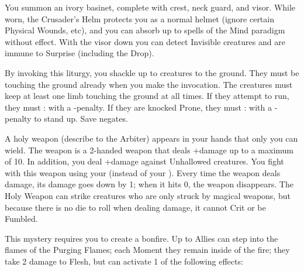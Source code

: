 {
\MYSTERY [
  Name = Crusader's Helm,
  Link = arcana-mystery-crusaders-helm,
  Paradigm = Force,
  Save = n/a,
  Duration = Session,
  Target = Self
]

You summon an ivory basinet, complete with crest, neck guard, and visor.  While worn, the Crusader's Helm protects you as a normal helmet (ignore certain Physical Wounds, etc), and you can absorb up to \DICE spells of the Mind paradigm without effect.  With the visor down you can detect Invisible creatures and are immune to Surprise (including the Drop).

\MYSTERY [
  Name = Grounding Mantra,
  Link = arcana-mystery-grounding-mantra,
  Paradigm = Elements,
  Save = Y (neg.),
  Duration = Markovian,
  Target = Close\, Nearby\, or Far-Away Target(s)
]

By invoking this liturgy, you shackle up to \DICE creatures to the ground.  They must be touching the ground already when you make the invocation.  The creatures must keep at least one limb touching the ground at all times.  If they attempt to run, they must \RB : \DEX with a -\DICE penalty.  If they are knocked Prone, they must \RB : \VIG with a -\DICE penalty to stand up.  Save negates.

\MYSTERY [
  Name = Holy Weapon,
  Link = arcana-mystery-holy-weapon,
  Paradigm = Force,
  Save = n/a,
  Duration = Session,
  Target = Self
]

A holy weapon (describe to the Arbiter) appears in your hands that only you can wield.  The weapon is a 2-handed weapon that deals \DICE+\DICE damage up to a maximum of 10.  In addition, you deal +\DICE damage against Unhallowed creatures. You fight with this weapon using your \FOC (instead of your \VIG). Every time the weapon deals damage, its damage goes down by 1; when it hits 0, the weapon disappears.  The Holy Weapon can strike creatures who are only struck by magical weapons, but because there is no die to roll when dealing damage, it cannot Crit or be Fumbled. 

\MYSTERY [
  Name = Purging Fire,
  Link = arcana-mystery-purging-fire,
  Paradigm = Elements,
  Save = N,
  Duration = \SUM Minutes,
  Target = See Below
]

This mystery requires you to create a bonfire.  Up to \DICE Allies can step into the flames of the Purging Flames; each Moment they remain inside of the fire; they take 2 damage to Flesh, but can activate 1 of the following effects:


}

